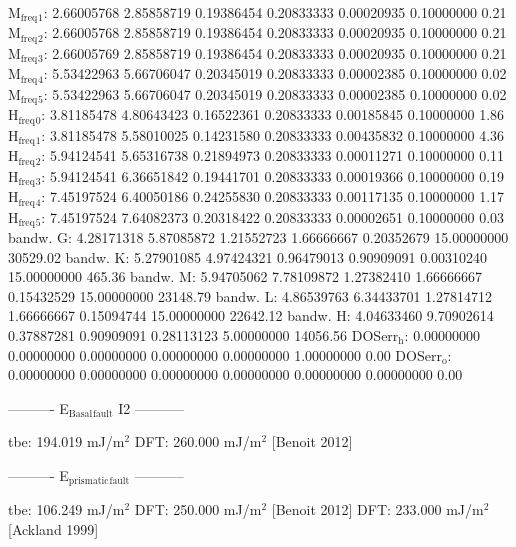 \documentclass[11pt]{article}
\begin{document}
 M\(_{\text{freq}}\)\(_{\text{1}}\):   2.66005768   2.85858719   0.19386454   0.20833333   0.00020935   0.10000000         0.21
 M\(_{\text{freq}}\)\(_{\text{2}}\):   2.66005768   2.85858719   0.19386454   0.20833333   0.00020935   0.10000000         0.21
 M\(_{\text{freq}}\)\(_{\text{3}}\):   2.66005769   2.85858719   0.19386454   0.20833333   0.00020935   0.10000000         0.21
 M\(_{\text{freq}}\)\(_{\text{4}}\):   5.53422963   5.66706047   0.20345019   0.20833333   0.00002385   0.10000000         0.02
 M\(_{\text{freq}}\)\(_{\text{5}}\):   5.53422963   5.66706047   0.20345019   0.20833333   0.00002385   0.10000000         0.02
 H\(_{\text{freq}}\)\(_{\text{0}}\):   3.81185478   4.80643423   0.16522361   0.20833333   0.00185845   0.10000000         1.86
 H\(_{\text{freq}}\)\(_{\text{1}}\):   3.81185478   5.58010025   0.14231580   0.20833333   0.00435832   0.10000000         4.36
 H\(_{\text{freq}}\)\(_{\text{2}}\):   5.94124541   5.65316738   0.21894973   0.20833333   0.00011271   0.10000000         0.11
 H\(_{\text{freq}}\)\(_{\text{3}}\):   5.94124541   6.36651842   0.19441701   0.20833333   0.00019366   0.10000000         0.19
 H\(_{\text{freq}}\)\(_{\text{4}}\):   7.45197524   6.40050186   0.24255830   0.20833333   0.00117135   0.10000000         1.17
 H\(_{\text{freq}}\)\(_{\text{5}}\):   7.45197524   7.64082373   0.20318422   0.20833333   0.00002651   0.10000000         0.03
 bandw. G:   4.28171318   5.87085872   1.21552723   1.66666667   0.20352679  15.00000000     30529.02
 bandw. K:   5.27901085   4.97424321   0.96479013   0.90909091   0.00310240  15.00000000       465.36
 bandw. M:   5.94705062   7.78109872   1.27382410   1.66666667   0.15432529  15.00000000     23148.79
 bandw. L:   4.86539763   6.34433701   1.27814712   1.66666667   0.15094744  15.00000000     22642.12
 bandw. H:   4.04633460   9.70902614   0.37887281   0.90909091   0.28113123   5.00000000     14056.56
 DOSerr\(_{\text{h}}\):   0.00000000   0.00000000   0.00000000   0.00000000   0.00000000   1.00000000         0.00
 DOSerr\(_{\text{o}}\):   0.00000000   0.00000000   0.00000000   0.00000000   0.00000000   0.00000000         0.00

----------     E\(_{\text{Basal}}\)\(_{\text{fault}}\) I2     -----------

tbe:       194.019 mJ/m\(^{\text{2}}\)
DFT:       260.000 mJ/m\(^{\text{2}}\) [Benoit  2012]


----------     E\(_{\text{prismatic}}\)\(_{\text{fault}}\)     -----------

tbe:       106.249 mJ/m\(^{\text{2}}\)
DFT:       250.000 mJ/m\(^{\text{2}}\) [Benoit  2012]
DFT:       233.000 mJ/m\(^{\text{2}}\) [Ackland 1999]
\end{document}
